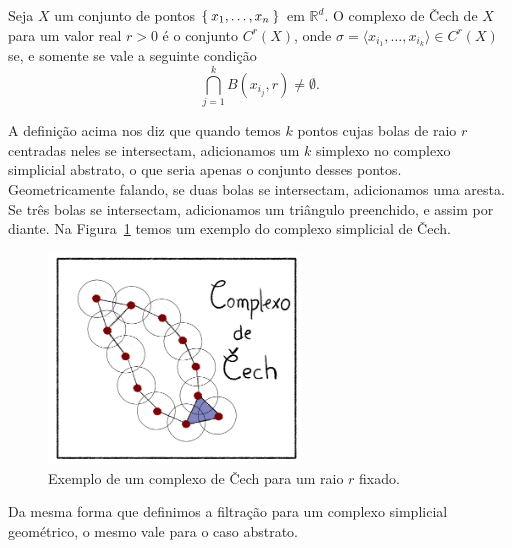 \begin{defi}
  Seja $X$ um conjunto de pontos $\Set{x_1, \dots, x_n}$ em $\mathbb{R}^d$. O complexo
  de \v{C}ech de $X$ para um valor real $r>0$ é o conjunto $C^r(X)$, onde
  $\sigma = \langle x_{i_1}, \dots, x_{i_k} \rangle \in C^r(X)$ se, e somente se vale a seguinte
  condição
  \begin{equation*}
    \bigcap_{j=1}^k B(x_{i_j},r) \neq \emptyset.
  \end{equation*}
\end{defi}
A definição acima nos diz que quando temos $k$ pontos cujas bolas de raio $r$
centradas neles se intersectam, adicionamos um $k$ simplexo no complexo simplicial
abstrato, o que seria apenas o conjunto desses pontos. Geometricamente falando,
se duas bolas se intersectam, adicionamos uma aresta. Se três bolas se intersectam,
adicionamos um triângulo preenchido, e assim por diante. Na Figura~\ref{fig:cech_ex}
temos um exemplo do complexo simplicial de \v{C}ech.
\begin{figure}[!htpb]
  \centering
  \includegraphics[width=0.6\textwidth]{images/ComplexCech.png}
  \caption{Exemplo de um complexo de \v{C}ech para um raio $r$ fixado.}
  \label{fig:cech_ex}
  \fautor
\end{figure}

Da mesma forma que definimos a filtração para um complexo simplicial geométrico,
o mesmo vale para o caso abstrato.

